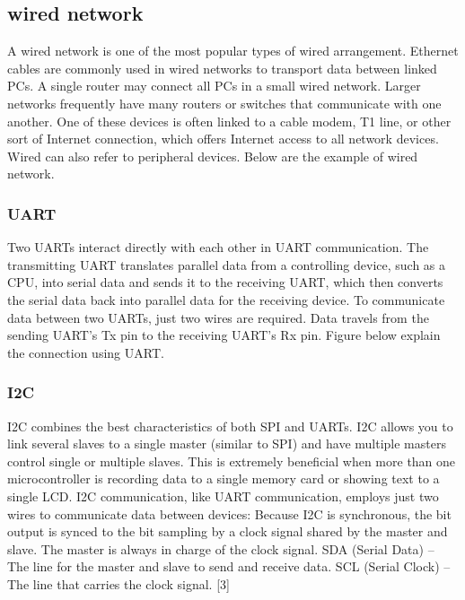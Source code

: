 \subsection{wired network}
A wired network is one of the most popular types of wired arrangement. Ethernet cables are commonly used in wired networks to transport data between linked PCs. A single router may connect all PCs in a small wired network. Larger networks frequently have many routers or switches that communicate with one another. One of these devices is often linked to a cable modem, T1 line, or other sort of Internet connection, which offers Internet access to all network devices. Wired can also refer to peripheral devices. Below are the example of wired network.

\subsubsection{UART}
Two UARTs interact directly with each other in UART communication. The transmitting UART translates parallel data from a controlling device, such as a CPU, into serial data and sends it to the receiving UART, which then converts the serial data back into parallel data for the receiving device. To communicate data between two UARTs, just two wires are required. Data travels from the sending UART's Tx pin to the receiving UART's Rx pin. Figure below explain the connection using UART.
\subsubsection{I2C}
I2C combines the best characteristics of both SPI and UARTs. I2C allows you to link several slaves to a single master (similar to SPI) and have multiple masters control single or multiple slaves. This is extremely beneficial when more than one microcontroller is recording data to a single memory card or showing text to a single LCD. I2C communication, like UART communication, employs just two wires to communicate data between devices: Because I2C is synchronous, the bit output is synced to the bit sampling by a clock signal shared by the master and slave. The master is always in charge of the clock signal. SDA (Serial Data) – The line for the master and slave to send and receive data. SCL (Serial Clock) – The line that carries the clock signal. [3]

